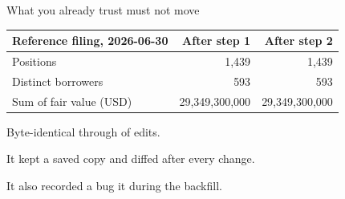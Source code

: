 \begin{frame}{What you already trust must not move}
\begin{center}\tabfont
\begin{tabular}{lrr}
\toprule
Reference filing, 2026-06-30 & After step 1 & After step 2 \\
\midrule
Positions & 1,439 & 1,439 \\
Distinct borrowers & 593 & 593 \\
Sum of fair value (USD) & 29,349,300,000 & 29,349,300,000 \\
\bottomrule
\end{tabular}
\end{center}
\vs
\begin{wideitemize}
    \item Byte-identical through  of edits. 
    \item It kept a saved copy and diffed after every change.
    \item It also recorded a bug it  during the backfill.
\end{wideitemize}
\vs
{}
\end{frame}
